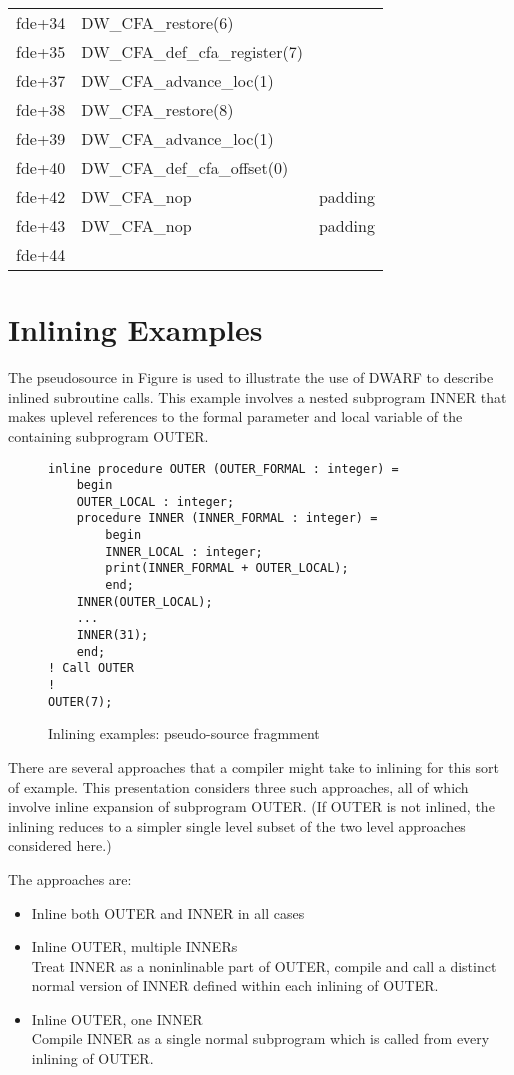 \begin{centering}
\begin{longtable}{lll}
fde+34&DW\-\_CFA\-\_restore(6) & \\
fde+35&DW\-\_CFA\-\_def\-\_cfa\-\_register(7)  & \\
fde+37&DW\-\_CFA\-\_advance\-\_loc(1) & \\
fde+38&DW\-\_CFA\-\_restore(8) &\\
fde+39&DW\-\_CFA\-\_advance\-\_loc(1) &\\
fde+40&DW\-\_CFA\-\_def\-\_cfa\-\_offset(0)  &\\
fde+42&DW\-\_CFA\-\_nop&padding \\
fde+43&DW\-\_CFA\-\_nop&padding \\
fde+44 && \\
\end{longtable}
\end{centering}

\section{Inlining Examples}
\label{app:inliningexamples}
The pseudo\dash source in 
Figure 
is used to illustrate the
use of DWARF to describe inlined subroutine calls. This
example involves a nested subprogram INNER that makes uplevel
references to the formal parameter and local variable of the
containing subprogram OUTER.

\begin{figure}[here]
\begin{lstlisting}
inline procedure OUTER (OUTER_FORMAL : integer) =
    begin
    OUTER_LOCAL : integer;
    procedure INNER (INNER_FORMAL : integer) =
        begin
        INNER_LOCAL : integer;
        print(INNER_FORMAL + OUTER_LOCAL);
        end;
    INNER(OUTER_LOCAL);
    ...
    INNER(31);
    end;
! Call OUTER
!
OUTER(7);
\end{lstlisting}
\caption{Inlining examples: pseudo-source fragmment} \label{fig:inliningexamplespseudosourcefragment}
\end{figure}


There are several approaches that a compiler might take to
inlining for this sort of example. This presentation considers
three such approaches, all of which involve inline expansion
of subprogram OUTER. (If OUTER is not inlined, the inlining
reduces to a simpler single level subset of the two level
approaches considered here.)

The approaches are:

\begin{itemize}[1.]
\item  Inline both OUTER and INNER in all cases

\item Inline OUTER, multiple INNERs \\
Treat INNER as a non\dash inlinable part of OUTER, compile and
call a distinct normal version of INNER defined within each
inlining of OUTER.

\item Inline OUTER, one INNER \\
Compile INNER as a single normal subprogram which is called
from every inlining of OUTER.
\end{itemize}


